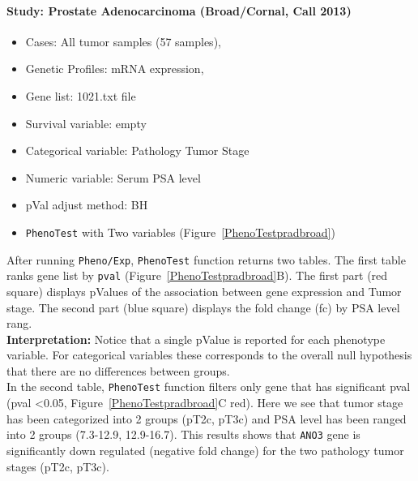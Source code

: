 \documentclass[a4paper]{article}
\begin{document}
\paragraph{Study: Prostate Adenocarcinoma (Broad/Cornal, Call 2013)} 
\begin{itemize}
    \item Cases: All tumor samples (57 samples),
    \item Genetic Profiles: mRNA expression,
    \item Gene list: 1021.txt file
    \item Survival variable: empty
    \item Categorical variable: Pathology Tumor Stage
    \item Numeric variable: Serum PSA level
    \item pVal adjust method: BH
    \item \texttt{PhenoTest} with Two variables (Figure~\ref{PhenoTestpradbroad})
\end{itemize}

After running \texttt{Pheno/Exp}, \texttt{PhenoTest} function returns two tables. The first table ranks gene list by \texttt{pval} (Figure~\ref{PhenoTestpradbroad}B). The first part (red square) displays pValues of the association between gene expression and Tumor stage. The second part (blue square) displays the fold change (fc) by PSA level rang.\\
\textbf{Interpretation:} Notice that a single pValue is reported for each phenotype variable. For categorical variables these corresponds to the overall null hypothesis that there are no differences between groups.\\
In the second table, \texttt{PhenoTest} function filters only gene that has significant pval (pval <0.05, Figure~\ref{PhenoTestpradbroad}C red). Here we see that tumor stage has been categorized into 2 groups (pT2c, pT3c) and PSA level has been ranged into 2 groups (7.3-12.9, 12.9-16.7). This results shows that \texttt{ANO3} gene is significantly down regulated (negative fold change) for the two pathology tumor stages (pT2c, pT3c).
\end{document}
